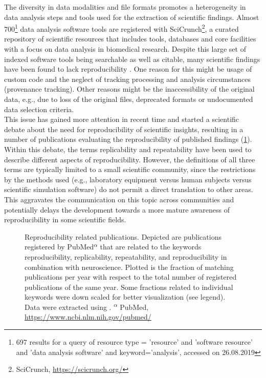 The diversity in data modalities and file formats promotes a heterogeneity in data analysis steps and tools used for the extraction of scientific findings. Almost 700\footnote{697 results for a query of resource type = 'resource' and 'software resource' and 'data analysis software' and keyword='analysis', accessed on 26.08.2019} data analysis software tools are registered with SciCrunch\footnote{SciCrunch, \url{https://scicrunch.org/}}, a curated repository of scientific resources that includes tools, databases and core facilities with a focus on data analysis in biomedical research. Despite this large set of indexed software tools being searchable as well as citable, many scientific findings have been found to lack reproducibility \citep{Ioannidis_2005,Ioannidis_2007,Baker_2016,Eisner_2018}. One reason for this might be usage of custom code and the neglect of tracking processing and analysis circumstances (provenance tracking). Other reasons might be the inaccessibility of the original data, e.g., due to loss of the original files, deprecated formats or undocumented data selection criteria.\\

This issue has gained more attention in recent time and started a scientific debate about the need for reproducibility of scientific insights, resulting in a number of publications evaluating the reproducibility of published findings (\cref{fig:intro_reproducibility}).
Within this debate, the terms replicability and repeatability \citep{Plesser_2018} have been used to describe different aspects of reproducibility. However, the definitions of all three terms are typically limited to a small scientific community, since the restrictions by the methods used (e.g., laboratory equipment versus human subjects versus scientific simulation software) do not permit a direct translation to other areas. This aggravates the communication on this topic across communities and potentially delays the development towards a more mature awareness of reproducibility in some scientific fields.\\


\begin{figure}[h!]
 \centering
 
 \caption[Reproducibility related publications]{Reproducibility related publications. Depicted  are publications registered by PubMed\textsuperscript{$\alpha$} that are related to the keywords reproducibility, replicability, repeatability, and reproducibility in combination with neuroscience. Plotted is the fraction of matching publications per year with respect to the total number of registered publications of the same year. Some fractions related to individual keywords were down scaled for better visualization (see legend). Data were extracted using \citet{Corlan_2004}. \small\textsuperscript{$\alpha$} PubMed, \url{https://www.ncbi.nlm.nih.gov/pubmed/}}
 \label{fig:intro_reproducibility}
\end{figure}

